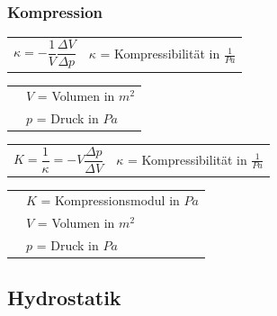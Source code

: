 	\subsubsection{Kompression}
		\begin{minipage}[t]{13cm}
				\renewcommand{\arraystretch}{2.5}
				\begin{tabular}{ p{4cm} p{7cm}}
					$\kappa = -\dfrac{1}{V} \dfrac{\Delta V}{\Delta p}$	&	$\kappa$ = Kompressibilität in $\frac{1}{Pa}$\\
				\end{tabular}
				\renewcommand{\arraystretch}{1.5}
				\begin{tabular}{ p{4cm} p{7cm} }
					& $V$ = Volumen in $m^2$\\
					& $p$ = Druck in $Pa$\\
				\end{tabular} 
				\renewcommand{\arraystretch}{1}
		\end{minipage}
		\newline
		\begin{minipage}[t]{13cm}
			\renewcommand{\arraystretch}{2.5}
			\begin{tabular}{ p{4cm} p{7cm}}
				$K = \dfrac{1}{\kappa} = -V \dfrac{\Delta p}{\Delta V}$	&	$\kappa$ = Kompressibilität in $\frac{1}{Pa}$\\
			\end{tabular}
			\renewcommand{\arraystretch}{1.5}
			\begin{tabular}{ p{4cm} p{7cm} }
				& $K$ = Kompressionsmodul in $Pa$\\
				& $V$ = Volumen in $m^2$\\
				& $p$ = Druck in $Pa$\\
			\end{tabular} 
			\renewcommand{\arraystretch}{1}
		\end{minipage}

\newpage	
\subsection{Hydrostatik}
